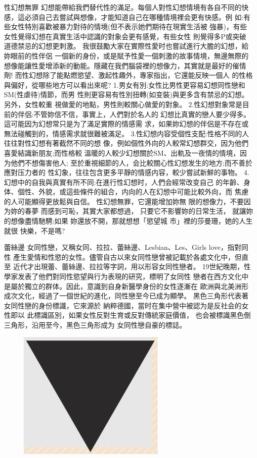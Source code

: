 \documentclass[12pt,UTF8]{ctexbook}
\begin{document}
性幻想無罪
幻想能帶給我們替代性的滿足。每個人對性幻想情境有各自不同的快
感，這必須自己去嘗試與想像，才能知道自己在哪種情境裡会更有快感。例
如:有些女性特別喜歡被暴力對待的情境(但不表示她們期待在現實生活被
強暴)，有些女性覺得幻想在真實生活中認識的對象会更有感覺，有些女性
則覺得多P或突破道德禁忌的幻想更刺激。
我很鼓勵大家在實際性愛时也嘗試進行大膽的幻想，給妳眼前的性伴侶
一個新的身份，或是賦予性愛一個刺激的故事情境，無邊無際的想像能讓性愛增添新的動能。隱藏在我們腦袋裡的想像力，其實就是最好的催情劑!
而性幻想除了能點燃慾望、激起性趣外，專家指出，它還能反映一個人
的性格與偏好，從哪些地方可以看出來呢?
1.男女有別:女性比男性更容易幻想同性戀和SM(性虐待)情節，而男
性則更容易有性別扭轉(如变裝)與更多含有禁忌的幻想。另外，女性較重
視做愛的地點，男性則較關心做愛的對象。
2.性幻想對象常是目前的伴侶:不管妳信不信，事實上，人們對於名人的
幻想比真實的戀人要少得多。這可能因为幻想常只是为了滿足實際的情感需
求，如果妳幻想的伴侶是不存在或無法碰觸到的，情感需求就很難被滿足。
3.性幻想内容受個性支配:性格不同的人往往對性幻想有著截然不同的想
像，例如個性外向的人較常幻想群交，因为他們喜愛結識新朋友;而性格較
溫暖的人較少幻想關於SM、出軌及一夜情的情境，因为他們不想傷害他人;
至於重視細節的人，会比較關心性幻想发生的地方;而不善於應對压力者的
性幻象，往往包含更多平靜的情感内容，較少嘗試新鮮的事物。
4.幻想中的自我與真實有所不同:在進行性幻想时，人們会經常改变自己
的年齡、身体、個性、外貌，或這些條件的組合，内向的人在幻想中可能比較外向，而
焦慮的人可能顯得更放鬆與自信。
性幻想無罪，它還能增加妳無
限的想像力，不要因为妳的春夢
而感到可恥，其實大家都想過，
只要它不影響妳的日常生活，
就讓妳的想像盡情馳騁;如果
妳還放不開，那就想想「慾望城
市」裡的莎曼珊，她的人生就很
快樂，不是嗎?

蕾絲邊
女同性戀，又稱女同、拉拉、蕾絲邊、Lesbian、Les、Girls love，指對同性
產生愛情和性慾的女性。儘管自古以來女同性戀曾被記載於各處文化中，但直至
近代才出現蕾、蕾絲邊、拉拉等字詞，用以形容女同性戀者。
19世紀晚期，性學家发表了他們對同性慾望與行为表現的研究，標明了女同性
戀者在西方文化中是屬於獨立的群体。因此，意識到自身新醫學身份的女性逐漸在
歐洲與北美洲形成次文化，經過了一個世紀的進化，同性戀至今已成为顯學。
黑色三角形代表著女同性戀的身份標識，它來源於
納粹德國，當时在集中營中被認为是反社会的女性即以
此標識區別，如果女性反對生育或反對傳統家庭價值，
也会被標識黑色倒三角形，沿用至今，黑色三角形成为
女同性戀自豪的標誌。

\begin{figure}[htbp]
	\centering
	\includegraphics[width=0.7\linewidth]{9}
	\caption{}
	\label{fig:1}
\end{figure}
\end{document}
